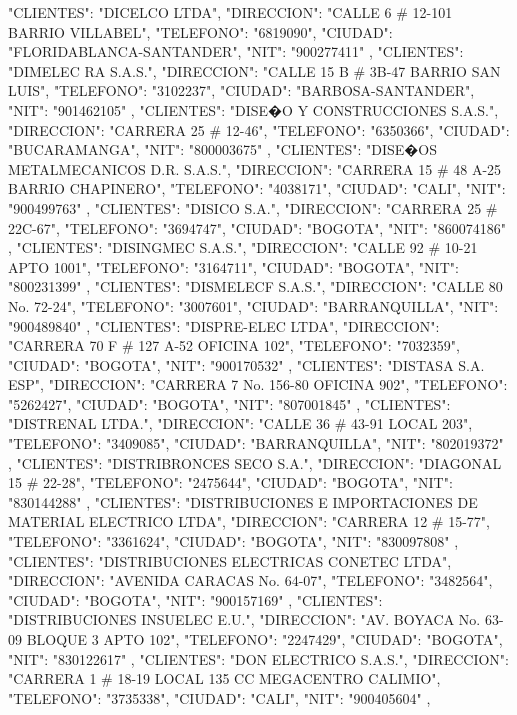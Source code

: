    {
   "CLIENTES": "DICELCO LTDA",
   "DIRECCION": "CALLE 6 # 12-101 BARRIO VILLABEL",
   "TELEFONO": "6819090",
   "CIUDAD": "FLORIDABLANCA-SANTANDER",
   "NIT": "900277411"
   },
   {
   "CLIENTES": "DIMELEC RA S.A.S.",
   "DIRECCION": "CALLE 15 B # 3B-47 BARRIO SAN LUIS",
   "TELEFONO": "3102237",
   "CIUDAD": "BARBOSA-SANTANDER",
   "NIT": "901462105"
   },
   {
   "CLIENTES": "DISE�O Y CONSTRUCCIONES S.A.S.",
   "DIRECCION": "CARRERA 25 # 12-46",
   "TELEFONO": "6350366",
   "CIUDAD": "BUCARAMANGA",
   "NIT": "800003675"
   },
   {
   "CLIENTES": "DISE�OS METALMECANICOS D.R. S.A.S.",
   "DIRECCION": "CARRERA 15 # 48 A-25 BARRIO CHAPINERO",
   "TELEFONO": "4038171",
   "CIUDAD": "CALI",
   "NIT": "900499763"
   },
   {
   "CLIENTES": "DISICO S.A.",
   "DIRECCION": "CARRERA 25 # 22C-67",
   "TELEFONO": "3694747",
   "CIUDAD": "BOGOTA",
   "NIT": "860074186"
   },
   {
   "CLIENTES": "DISINGMEC S.A.S.",
   "DIRECCION": "CALLE 92 # 10-21 APTO 1001",
   "TELEFONO": "3164711",
   "CIUDAD": "BOGOTA",
   "NIT": "800231399"
   },
   {
   "CLIENTES": "DISMELECF S.A.S.",
   "DIRECCION": "CALLE 80 No. 72-24",
   "TELEFONO": "3007601",
   "CIUDAD": "BARRANQUILLA",
   "NIT": "900489840"
   },
   {
   "CLIENTES": "DISPRE-ELEC LTDA",
   "DIRECCION": "CARRERA 70 F # 127 A-52 OFICINA 102",
   "TELEFONO": "7032359",
   "CIUDAD": "BOGOTA",
   "NIT": "900170532"
   },
   {
   "CLIENTES": "DISTASA S.A. ESP",
   "DIRECCION": "CARRERA 7 No. 156-80 OFICINA 902",
   "TELEFONO": "5262427",
   "CIUDAD": "BOGOTA",
   "NIT": "807001845"
   },
   {
   "CLIENTES": "DISTRENAL LTDA.",
   "DIRECCION": "CALLE 36 # 43-91 LOCAL 203",
   "TELEFONO": "3409085",
   "CIUDAD": "BARRANQUILLA",
   "NIT": "802019372"
   },
   {
   "CLIENTES": "DISTRIBRONCES SECO S.A.",
   "DIRECCION": "DIAGONAL 15 # 22-28",
   "TELEFONO": "2475644",
   "CIUDAD": "BOGOTA",
   "NIT": "830144288"
   },
   {
   "CLIENTES": "DISTRIBUCIONES E IMPORTACIONES DE MATERIAL ELECTRICO LTDA",
   "DIRECCION": "CARRERA 12 # 15-77",
   "TELEFONO": "3361624",
   "CIUDAD": "BOGOTA",
   "NIT": "830097808"
   },
   {
   "CLIENTES": "DISTRIBUCIONES ELECTRICAS CONETEC LTDA",
   "DIRECCION": "AVENIDA CARACAS No. 64-07",
   "TELEFONO": "3482564",
   "CIUDAD": "BOGOTA",
   "NIT": "900157169"
   },
   {
   "CLIENTES": "DISTRIBUCIONES INSUELEC E.U.",
   "DIRECCION": "AV. BOYACA No. 63-09 BLOQUE 3 APTO 102",
   "TELEFONO": "2247429",
   "CIUDAD": "BOGOTA",
   "NIT": "830122617"
   },
   {
   "CLIENTES": "DON ELECTRICO S.A.S.",
   "DIRECCION": "CARRERA 1 # 18-19 LOCAL 135 CC MEGACENTRO CALIMIO",
   "TELEFONO": "3735338",
   "CIUDAD": "CALI",
   "NIT": "900405604"
   },
